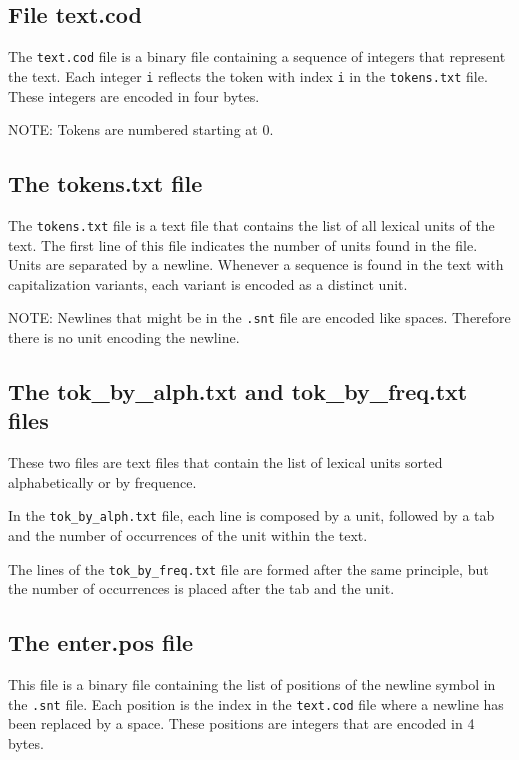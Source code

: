 \subsection{File text.cod}
The \verb+text.cod+ file is a binary file containing a sequence of integers that
represent the text. Each integer \verb+i+ reflects the token with index \verb+i+
in the \verb+tokens.txt+ file. These integers are encoded in four bytes.

\bigskip
\noindent NOTE: Tokens are numbered starting at 0.

\subsection{The tokens.txt file}
The \verb+tokens.txt+ file is a text file that contains the list of all lexical
units of the text. The first line of this file indicates the number of units
found in the file. Units are separated by a newline. Whenever a sequence is found
in the text with capitalization variants, each variant is encoded as a distinct
unit.

\bigskip
\noindent NOTE: Newlines that might be in the \verb+.snt+ file are encoded like
spaces. Therefore there is no unit encoding the newline.

\subsection{The tok\_by\_alph.txt and tok\_by\_freq.txt files}
These two files are text files that contain the list of lexical units sorted
alphabetically or by frequence.

\bigskip
\noindent In the \verb+tok_by_alph.txt+ file, each line is composed by a unit, followed by
a tab and the number of occurrences of the unit within the text.

\bigskip
\noindent The lines of the \verb+tok_by_freq.txt+ file are formed after the same principle,
but the number of occurrences is placed after the tab and the unit.


\subsection{The enter.pos file}
This file is a binary file containing the list of positions of the newline symbol
in the \verb+.snt+ file. Each position is the index in the \verb+text.cod+ file
where a newline has been replaced by a space. These positions are integers that
are encoded in 4 bytes.


